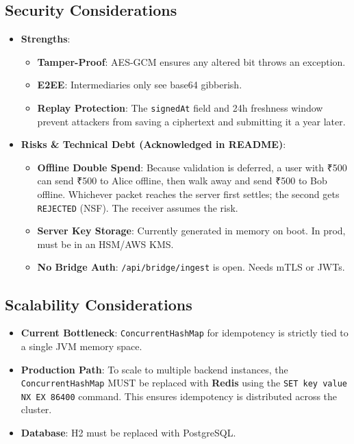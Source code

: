 \documentclass[11pt, a4paper]{article}
\begin{document}
\subsection*{Security Considerations}
\begin{itemize}
    \item \textbf{Strengths}:
    \begin{itemize}
        \item \textbf{Tamper-Proof}: AES-GCM ensures any altered bit throws an exception.
        \item \textbf{E2EE}: Intermediaries only see base64 gibberish.
        \item \textbf{Replay Protection}: The \texttt{signedAt} field and 24h freshness window prevent attackers from saving a ciphertext and submitting it a year later.
    \end{itemize}
    \item \textbf{Risks \& Technical Debt (Acknowledged in README)}:
    \begin{itemize}
        \item \textbf{Offline Double Spend}: Because validation is deferred, a user with ₹500 can send ₹500 to Alice offline, then walk away and send ₹500 to Bob offline. Whichever packet reaches the server first settles; the second gets \texttt{REJECTED} (NSF). The receiver assumes the risk.
        \item \textbf{Server Key Storage}: Currently generated in memory on boot. In prod, must be in an HSM/AWS KMS.
        \item \textbf{No Bridge Auth}: \texttt{/api/bridge/ingest} is open. Needs mTLS or JWTs.
    \end{itemize}
\end{itemize}

\subsection*{Scalability Considerations}
\begin{itemize}
    \item \textbf{Current Bottleneck}: \texttt{ConcurrentHashMap} for idempotency is strictly tied to a single JVM memory space.
    \item \textbf{Production Path}: To scale to multiple backend instances, the \texttt{ConcurrentHashMap} MUST be replaced with \textbf{Redis} using the \texttt{SET key value NX EX 86400} command. This ensures idempotency is distributed across the cluster.
    \item \textbf{Database}: H2 must be replaced with PostgreSQL.
\end{itemize}
\end{document}
